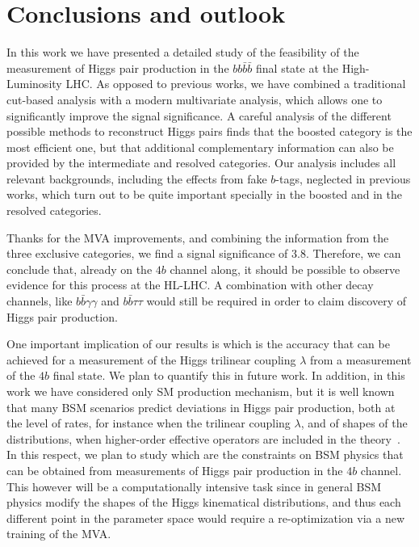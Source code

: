 \section{Conclusions and outlook}
\label{sec:conclusions}

In this work we have presented a detailed study of the feasibility
of the measurement of Higgs pair production in the $bb\bar{b}\bar{b}$
final state at the High-Luminosity LHC.
%
As opposed to previous works, we have combined a traditional
cut-based analysis with a modern multivariate analysis,
which allows one to significantly improve the signal significance.
%
A careful analysis of the different possible methods to reconstruct
Higgs pairs finds that the boosted category is the most efficient
one, but that additional complementary information can also be provided
by the intermediate and resolved categories.
%
Our analysis includes all relevant backgrounds, including the
effects from fake $b$-tags, neglected in previous works,
which turn out to be quite important specially
in the boosted and in the resolved categories.

Thanks for the MVA improvements, and combining the information
from the three exclusive categories, we find a signal significance
of 3.8.
%
Therefore, we can conclude that, already on the $4b$ channel along,
it should be possible to observe evidence for this process at
the HL-LHC.
%
A combination with other decay channels, like $b\bar{b}\gamma\gamma$
and $b\bar{b}\tau\tau$ would still be required in order
to claim discovery of Higgs pair production.


One important implication of our results is which is the accuracy
that can be achieved for a measurement of the
Higgs trilinear coupling $\lambda$ from a measurement
of the $4b$ final state.
%
We plan to quantify this in future work.
%
In addition,
in this work we have considered only SM production mechanism,
but it is well known that many BSM scenarios predict deviations
in Higgs pair production, both at the level of rates,
for instance when the trilinear coupling $\lambda$, and of
shapes of the distributions, when higher-order effective
operators are included in the theory~\cite{Azatov:2015oxa}.
%
In this respect, we plan to study which are the constraints
on BSM physics that can be obtained from measurements
of Higgs pair production in the $4b$ channel.
%
This however will be a computationally intensive task since in
general BSM physics modify the shapes of the Higgs kinematical
distributions, and thus each different point in the parameter
space would require a re-optimization via a new training
of the MVA.

